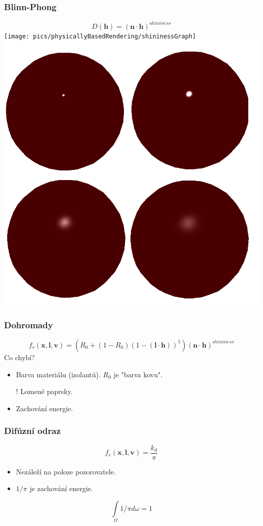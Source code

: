 \begin{frame}
    \frametitle{Blinn-Phong}
    \begin{equation*}
        D(\mathbf h) = (\mathbf n \cdot \mathbf h)^{\mathrm shininess}
    \end{equation*}
    \texttt{[image: pics/physicallyBasedRendering/shininessGraph]}
    \includegraphics[width=.5\textwidth]{pics/physicallyBasedRendering/shininess.png}
\end{frame}

\begin{frame}
    \frametitle{Dohromady}
    \begin{equation*}
        f_r(\mathbf x, \mathbf l, \mathbf v) = (R_0 + (1-R_0)(1-(\mathbf l \cdot \mathbf h))^5)(\mathbf n \cdot \mathbf h)^{\mathrm shininess}
    \end{equation*}
    Co chybí?
    \begin{itemize}
        \item Barva materiálu (izolantú). $R_0$ je "barva kovu".
        \item[!] Lomené paprsky.
        \item Zachování energie.
    \end{itemize}
\end{frame}

\begin{frame}
    \frametitle{Difúzní odraz}
    \begin{equation*}
        f_r(\mathbf x, \mathbf l, \mathbf v) = \frac{k_d}{\pi}
    \end{equation*}
    \begin{itemize}
        \item Nezáleží na poloze pozorovatele.
        \item $1/\pi$ je zachování energie.
    \end{itemize}
    \begin{equation*}
        \int\limits_\Omega 1/\pi d\omega = 1
    \end{equation*}
\end{frame}


